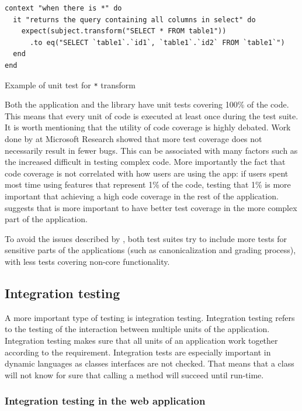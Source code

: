 \begin{listing}[H]
\begin{verbatim}
context "when there is *" do
  it "returns the query containing all columns in select" do
    expect(subject.transform("SELECT * FROM table1"))
      .to eq("SELECT `table1`.`id1`, `table1`.`id2` FROM `table1`")
  end
end
\end{verbatim}
\caption{Example of unit test for \texttt{*} transform}
\label{fig:example_unit_test}
\end{listing}

Both the application and the library have unit tests covering 100\% of the code. This means that every unit of code is executed at least once during the test suite. It is worth mentioning that the utility of code coverage is highly debated. Work done by \cite{msft_testing} at Microsoft Research showed that more test coverage does not necessarily result in fewer bugs. This can be associated with many factors such as the increased difficult in testing complex code. More importantly the fact that code coverage is not correlated with how users are using the app: if users spent most time using features that represent 1\% of the code, testing that 1\% is more important that achieving a high code coverage in the rest of the application. \cite{msft_testing} suggests that is more important to have better test coverage in the more complex part of the application.

To avoid the issues described by \cite{msft_testing}, both test suites try to include more tests for sensitive parts of the applications (such as canonicalization and grading process), with less tests covering non-core functionality. 

\subsection{Integration testing}

A more important type of testing is integration testing. Integration testing refers to the testing of the interaction between multiple units of the application. Integration testing makes sure that all units of an application work together according to the requirement. Integration tests are especially important in dynamic languages as classes interfaces are not checked. That means that a class will not know for sure that calling a method will succeed until run-time.

\subsubsection{Integration testing in the web application}
